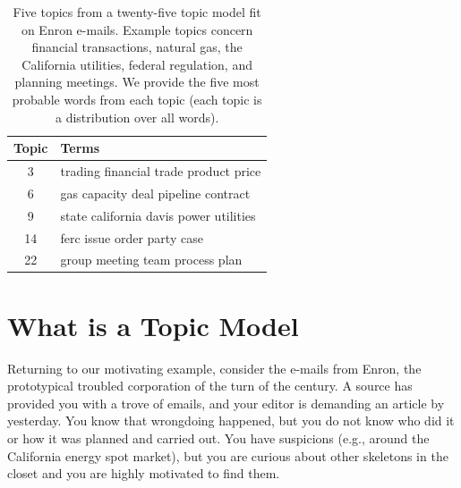 \begin{table}
  \caption{Five topics from a twenty-five topic model fit on Enron
    e-mails.  Example topics concern financial transactions, natural
    gas, the California utilities, federal regulation, and planning
    meetings.  We provide the five most probable words from each topic
  (each topic is a distribution over all words).}
  \label{tab:enron_topics}

\begin{center}
\begin{tabular}{cp{10cm}}
\hline
\rowcolor{gray!50}
\hline
Topic & Terms \\
\hline \hline
3 & trading financial trade product price  \\
6 & gas capacity deal pipeline contract \\
9 & state california davis power utilities \\
14 & ferc issue order party case \\
22 & group meeting team process plan \\
\hline
\end{tabular}
\end{center}
\end{table}


\section{What is a Topic Model}

Returning to our motivating example, consider the e-mails from Enron, the prototypical
troubled corporation of the turn of the century.  A source has provided you with a trove of emails, and your editor is demanding an article by yesterday.  You know
that wrongdoing happened, but you do not know who did it or how it was planned
and carried out.  You have suspicions (e.g., around the California energy spot market),
but you are curious about other skeletons in the closet and
you are highly motivated to find them.

